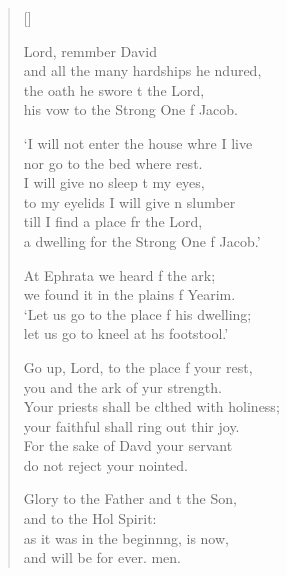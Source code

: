 \settowidth{\versewidth}{Your priests shall be clothed with holiness; *}
\begin{verse}[\versewidth]
  \begin{patverse}
 Lord, remmber David\Med\\
    and all the many hardships he ndured,\\
the oath he swore t the Lord,\Med\\
    his vow to the Strong One f Jacob.

‘I will not enter the house whre I live\Med\\
    nor go to the bed where  rest.\\
I will give no sleep t my eyes,\Med\\
    to my eyelids I will give n slumber\\
till I find a place fr the Lord,\Med\\
    a dwelling for the Strong One f Jacob.’

At Ephrata we heard f the ark;\Med\\
    we found it in the plains f Yearim.\\
‘Let us go to the place f his dwelling;\Med\\
    let us go to kneel at h\pointup{\i}s footstool.’

Go up, Lord, to the place f your rest,\Med\\
    you and the ark of yur strength.\\
Your priests shall be clthed with holiness;\Med\\
    your faithful shall ring out thir joy.\\
For the sake of Dav\pointup{\i}d your servant\Med\\
    do not reject your nointed.

Glory to the Father and t the Son,\Med\\
    and to the Hol Spirit:\\
as it was in the beginn\pointup{\i}ng, is now,\Med\\
    and will be for ever. men.
  \end{patverse}
\end{verse}
